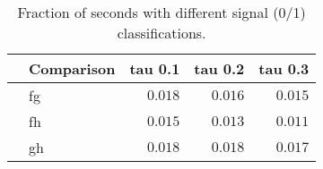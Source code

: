 \begin{table}[!tbp]
\caption{Fraction of seconds with different signal (0/1) classifications.\label{}} 
\begin{center}
\begin{tabular}{llrrr}
\hline\hline
\multicolumn{1}{l}{}&\multicolumn{1}{c}{Comparison}&\multicolumn{1}{c}{tau 0.1}&\multicolumn{1}{c}{tau 0.2}&\multicolumn{1}{c}{tau 0.3}\tabularnewline
\hline
&fg&$0.018$&$0.016$&$0.015$\tabularnewline
&fh&$0.015$&$0.013$&$0.011$\tabularnewline
&gh&$0.018$&$0.018$&$0.017$\tabularnewline
\hline
\end{tabular}\end{center}
\end{table}
